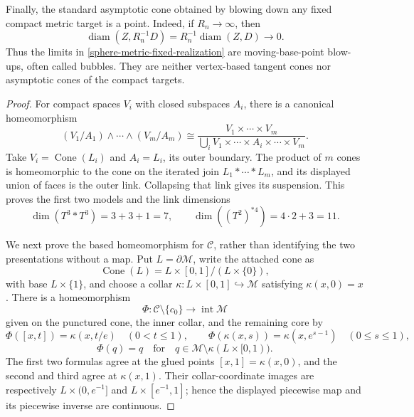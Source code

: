 \begin{proposition}
Finally, the standard asymptotic cone obtained by blowing down any fixed
compact metric target is a point.  Indeed, if \(R_n\to\infty\), then
\[
 \operatorname{diam}(Z,R_n^{-1}D)
 =R_n^{-1}\operatorname{diam}(Z,D)\longrightarrow0.
\]
Thus the limits in \cref{sphere-metric-fixed-realization} are
moving-base-point blow-ups, often called bubbles.  They are neither
vertex-based tangent cones nor asymptotic cones of the compact targets.
\end{proposition}

\begin{proof}
For compact spaces \(V_i\) with closed subspaces \(A_i\), there is a
canonical homeomorphism
\[
 (V_1/A_1)\wedge\cdots\wedge(V_m/A_m)
 \cong
 \frac{V_1\times\cdots\times V_m}
      {\bigcup_iV_1\times\cdots\times A_i\times\cdots\times V_m}.
\]
Take \(V_i=\operatorname{Cone}(L_i)\) and \(A_i=L_i\), its outer boundary.
The product of \(m\) cones is homeomorphic to the cone on the iterated join
\(L_1*\cdots*L_m\), and its displayed union of faces is the outer link.
Collapsing that link gives its suspension.  This proves the first two
models and the link dimensions
\[
 \dim(T^3*T^3)=3+3+1=7,
 \qquad
 \dim((T^2)^{*4})=4\cdot2+3=11.
\]

We next prove the based homeomorphism for \(\mathcal C\), rather than
identifying the two presentations without a map.  Put
\(L=\partial\mathcal M\), write the attached cone as
\[
 \operatorname{Cone}(L)
 =L\times[0,1]/(L\times\{0\}),
\]
with base \(L\times\{1\}\), and choose a collar
\(\kappa:L\times[0,1]\hookrightarrow\mathcal M\) satisfying
\(\kappa(x,0)=x\).  There is a homeomorphism
\[
 \Phi:\mathcal C\setminus\{c_0\}
       \longrightarrow\operatorname{int}\mathcal M
\]
given on the punctured cone, the inner collar, and the remaining core by
\[
 \Phi([x,t])=\kappa(x,t/e)\quad(0<t\leq1),\qquad
 \Phi(\kappa(x,s))=\kappa(x,e^{s-1})\quad(0\leq s\leq1),
\]
\[
 \Phi(q)=q
 \quad\text{for}\quad
 q\in\mathcal M\setminus\kappa(L\times[0,1)).
\]
The first two formulas agree at the glued points
\([x,1]=\kappa(x,0)\), and the second and third agree at
\(\kappa(x,1)\).  Their collar-coordinate images are respectively
\(L\times(0,e^{-1}]\) and \(L\times[e^{-1},1]\); hence the displayed
piecewise map and its piecewise inverse are continuous.


\end{proof}
